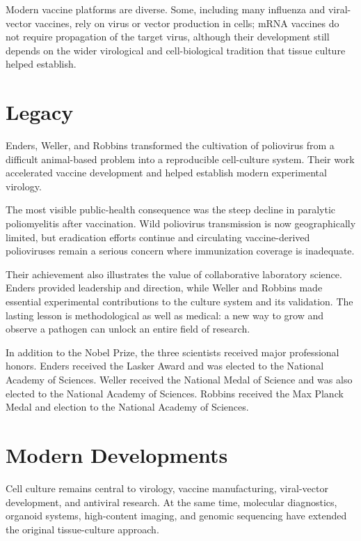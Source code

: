 Modern vaccine platforms are diverse. Some, including many influenza and viral-vector vaccines, rely on virus or vector production in cells; mRNA vaccines do not require propagation of the target virus, although their development still depends on the wider virological and cell-biological tradition that tissue culture helped establish.

\section{Legacy}

Enders, Weller, and Robbins transformed the cultivation of poliovirus from a difficult animal-based problem into a reproducible cell-culture system. Their work accelerated vaccine development and helped establish modern experimental virology.

The most visible public-health consequence was the steep decline in paralytic poliomyelitis after vaccination. Wild poliovirus transmission is now geographically limited, but eradication efforts continue and circulating vaccine-derived polioviruses remain a serious concern where immunization coverage is inadequate.

Their achievement also illustrates the value of collaborative laboratory science. Enders provided leadership and direction, while Weller and Robbins made essential experimental contributions to the culture system and its validation. The lasting lesson is methodological as well as medical: a new way to grow and observe a pathogen can unlock an entire field of research.

In addition to the Nobel Prize, the three scientists received major professional honors. Enders received the Lasker Award and was elected to the National Academy of Sciences. Weller received the National Medal of Science and was also elected to the National Academy of Sciences. Robbins received the Max Planck Medal and election to the National Academy of Sciences.

\section{Modern Developments}

Cell culture remains central to virology, vaccine manufacturing, viral-vector development, and antiviral research. At the same time, molecular diagnostics, organoid systems, high-content imaging, and genomic sequencing have extended the original tissue-culture approach.


